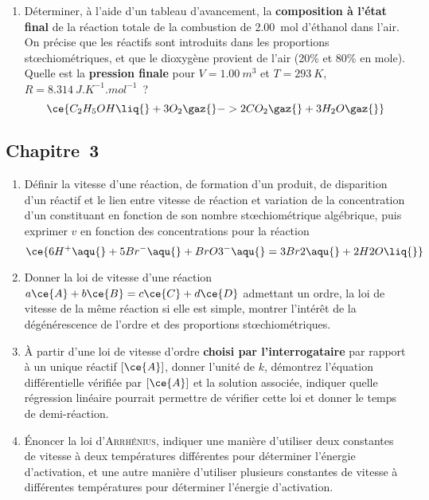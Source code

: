 \documentclass[a4paper, 12pt, final, garamond]{book}
\begin{document}
\begin{enumerate}
	\item Déterminer, à l'aide d'un tableau d'avancement, la \textbf{composition à
		      l'état final} de la réaction totale de la combustion de \SI{2.00}{mol}
	      d'éthanol dans l'air. On précise que les réactifs sont introduits dans
	      les proportions stœchiométriques, et que le dioxygène provient de
	      l'air (20\%  et 80\%  en mole). Quelle est la
	      \textbf{pression finale} pour $V = \SI{1.00}{m^3}$ et $T =
		      \SI{293}{K}$, $R = \SI{8.314}{J.K^{-1}.mol^{-1}}$~?
	      \[
		      \ce{C_2H_5OH\liq{} + 3O_2\gaz{} -> 2CO_2\gaz{} + 3H_2O\gaz{}}
	      \]
\end{enumerate}
\subsection{Chapitre~3}

\begin{enumerate}[resume]
	\item Définir la vitesse d'une réaction, de formation d'un produit, de
	      disparition d'un réactif et le lien entre vitesse de réaction et
	      variation de la concentration d'un constituant en fonction de son nombre
	      stœchiométrique algébrique, puis exprimer $v$ en fonction des
	      concentrations pour la réaction
	      \[
		      \ce{6H^{+}\aqu{} + 5Br^{-}\aqu{} + BrO3^{-}\aqu{}
			      =
			      3Br2\aqu{} + 2H2O\liq{}}
	      \]
	\item Donner la loi de vitesse d'une réaction $a\ce{A} + b\ce{B} = c\ce{C}
		      + d\ce{D}$ admettant un ordre, la loi de vitesse de la même réaction
	      si elle est simple, montrer l'intérêt de la dégénérescence de l'ordre
	      et des proportions stœchiométriques.
	\item À partir d'une loi de vitesse d'ordre \textbf{choisi par
		      l'interrogataire} par rapport à un unique réactif $[\ce{A}]$, donner
	      l'unité de $k$, démontrez l'équation différentielle vérifiée par
	      $[\ce{A}]$ et la solution associée, indiquer quelle régression linéaire
	      pourrait permettre de vérifier cette loi et donner le temps de
	      demi-réaction.
	\item Énoncer la loi d'\textsc{Arrhénius}, indiquer une manière d'utiliser
	      deux constantes de vitesse à deux températures différentes pour
	      déterminer l'énergie d'activation, et une autre manière d'utiliser
	      plusieurs constantes de vitesse à différentes températures pour
	      déterminer l'énergie d'activation.
\end{enumerate}
\end{document}
